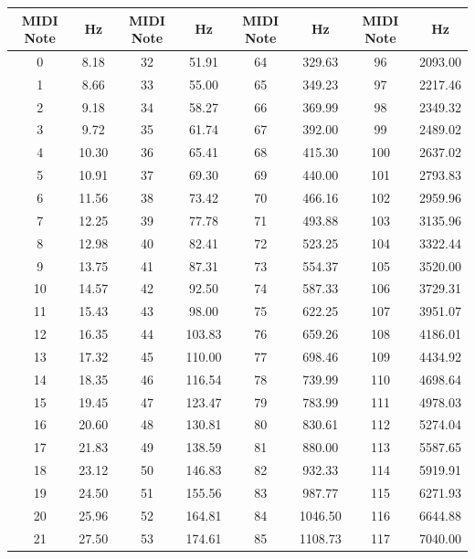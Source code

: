 \documentclass[11pt, a4paper]{report}
\begin{document}
\label{fig:note2freq}
\begin{center}
 \begin{tabular}{|c|c||c|c||c|c||c|c|} 
 \hline
 MIDI Note& Hz & MIDI Note& Hz & MIDI Note& Hz & MIDI Note&Hz\\
 \hline
 0 & 8.18 & 32 & 51.91& 64 & 329.63 & 96 & 2093.00 \\
 \hline
1 & 8.66 & 33 & 55.00& 65 & 349.23 & 97 & 2217.46 \\
 \hline
2 & 9.18 & 34 & 58.27& 66 & 369.99 & 98 & 2349.32 \\
 \hline
3 & 9.72 & 35 & 61.74& 67 & 392.00 & 99 & 2489.02 \\
 \hline
4 & 10.30 & 36 & 65.41& 68 & 415.30 & 100 & 2637.02 \\
 \hline
5 & 10.91 & 37 & 69.30& 69 & 440.00 & 101 & 2793.83 \\
 \hline
6 & 11.56 & 38 & 73.42& 70 & 466.16 & 102 & 2959.96 \\
 \hline
7 & 12.25 & 39 & 77.78& 71 & 493.88 & 103 & 3135.96 \\
 \hline
8 & 12.98 & 40 & 82.41& 72 & 523.25 & 104 & 3322.44 \\
 \hline
9 & 13.75 & 41 & 87.31& 73 & 554.37 & 105 & 3520.00 \\
 \hline
10 & 14.57 & 42 & 92.50& 74 & 587.33 & 106 & 3729.31 \\
 \hline
11 & 15.43 & 43 & 98.00& 75 & 622.25 & 107 & 3951.07 \\
 \hline
12 & 16.35 & 44 & 103.83& 76 & 659.26 & 108 & 4186.01 \\
 \hline
13 & 17.32 & 45 & 110.00& 77 & 698.46 & 109 & 4434.92 \\
 \hline
14 & 18.35 & 46 & 116.54& 78 & 739.99 & 110 & 4698.64 \\
 \hline
15 & 19.45 & 47 & 123.47& 79 & 783.99 & 111 & 4978.03 \\
 \hline
16 & 20.60 & 48 & 130.81& 80 & 830.61 & 112 & 5274.04 \\
 \hline
17 & 21.83 & 49 & 138.59& 81 & 880.00 & 113 & 5587.65 \\
 \hline
18 & 23.12 & 50 & 146.83& 82 & 932.33 & 114 & 5919.91 \\
 \hline
19 & 24.50 & 51 & 155.56& 83 & 987.77 & 115 & 6271.93 \\
 \hline
20 & 25.96 & 52 & 164.81& 84 & 1046.50 & 116 & 6644.88 \\
 \hline
21 & 27.50 & 53 & 174.61& 85 & 1108.73 & 117 & 7040.00 \\
 \hline

\end{tabular}
\end{center}
\end{document}
